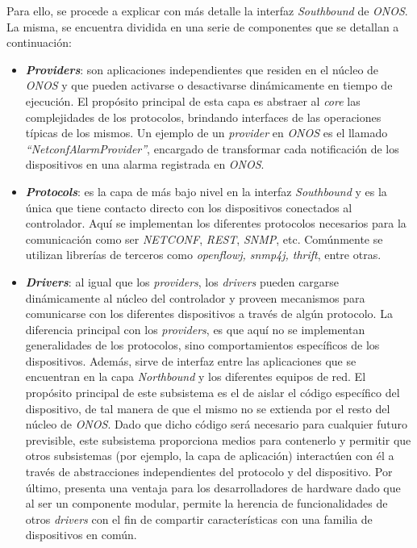   Para ello, se procede a explicar con más detalle la interfaz \textit{Southbound} de \textit{ONOS}. La misma, se encuentra dividida en una serie de componentes que se detallan a continuación:

  \begin{itemize}
	\item \textbf{\textit{Providers}}: son aplicaciones independientes que residen en el núcleo de \textit{ONOS} y que pueden activarse o desactivarse dinámicamente en tiempo de ejecución. El propósito principal de esta capa es abstraer al \textit{core} las complejidades de los protocolos, brindando interfaces de las operaciones típicas de los mismos. Un ejemplo de un \textit{provider} en \textit{ONOS} es el llamado \textit{“NetconfAlarmProvider”}, encargado de transformar cada notificación de los dispositivos en una alarma registrada en \textit{ONOS}.
	\item \textbf{\textit{Protocols}}: es la capa de más bajo nivel en la interfaz \textit{Southbound} y es la única que tiene contacto directo con los dispositivos conectados al controlador. Aquí se implementan los diferentes protocolos necesarios para la comunicación como ser \textit{NETCONF}, \textit{REST}, \textit{SNMP}, etc. Comúnmente se utilizan librerías de terceros como \textit{openflowj, snmp4j, thrift}, entre otras.
	\item \textbf{\textit{Drivers}}: al igual que los \textit{providers}, los \textit{drivers} pueden cargarse dinámicamente al núcleo del controlador y proveen mecanismos para comunicarse con los diferentes dispositivos a través de algún protocolo. La diferencia principal con los \textit{providers}, es que aquí no se implementan generalidades de los protocolos, sino comportamientos específicos de los dispositivos. Además, sirve de interfaz entre las aplicaciones que se encuentran en la capa \textit{Northbound} y los diferentes equipos de red. El propósito principal de este subsistema es el de aislar el código específico del dispositivo, de tal manera de que el mismo no se extienda por el resto del núcleo de \textit{ONOS}. Dado que dicho código será necesario para cualquier futuro previsible, este subsistema proporciona medios para contenerlo y permitir que otros subsistemas (por ejemplo, la capa de aplicación) interactúen con él a través de abstracciones independientes del protocolo y del dispositivo. Por último, presenta una ventaja para los desarrolladores de hardware dado que al ser un componente modular, permite la herencia de funcionalidades de otros \textit{drivers} con el fin de compartir características con una familia de dispositivos en común.
\end{itemize}

